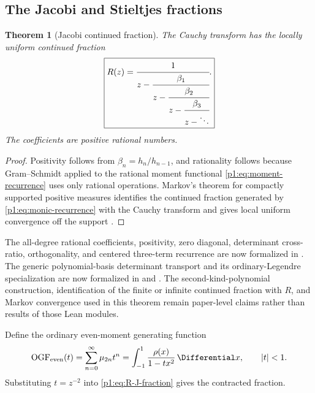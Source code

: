 \documentclass[11pt]{article}
\newtheorem{theorem}{Theorem}[section]
\theoremstyle{definition}
\theoremstyle{remark}
\newcommand{\EvenMomentOrdinaryGeneratingFunction}{\operatorname{OGF}_{\mathrm{even}}}
\begin{document}
\subsection{The Jacobi and Stieltjes fractions}

\begin{theorem}[Jacobi continued fraction]\label{p1:thm:J-fraction}
The Cauchy transform has the locally uniform continued fraction
\begin{equation}
 \boxed{
 R(z)=\cfrac{1}{z-\cfrac{\beta_1}{z-\cfrac{\beta_2}{z-
           \cfrac{\beta_3}{z-\ddots}}}}.
 }                                                           \label{p1:eq:R-J-fraction}
\end{equation}
The coefficients are positive rational numbers.
\end{theorem}

\begin{proof}
Positivity follows from \(\beta_n=h_n/h_{n-1}\), and rationality follows because
Gram--Schmidt applied to the rational moment functional \eqref{p1:eq:moment-recurrence}
uses only rational operations.  Markov's theorem for compactly supported positive measures
identifies the continued fraction generated by \eqref{p1:eq:monic-recurrence} with the Cauchy
transform and gives local uniform convergence off the support \cite{p1:VanAssche1993,p1:SimonOPRL}.
\end{proof}

The all-degree rational coefficients, positivity, zero diagonal, determinant
cross-ratio, orthogonality, and centered three-term recurrence are now formalized in
.  The generic polynomial-basis determinant transport and
its ordinary-Legendre specialization are now formalized in
 and
.  The second-kind-polynomial construction,
identification of the finite or infinite continued fraction with \(R\), and Markov
convergence used in this theorem remain paper-level claims rather than results of those
Lean modules.

Define the ordinary even-moment generating function
\begin{equation}
 \EvenMomentOrdinaryGeneratingFunction(t)=\sum_{n=0}^{\infty}\mu_{2n}t^n
 =\int_{-1}^{1}\frac{\rho(x)}{1-tx^2}\,\Differential x,
 \qquad |t|<1.                                               \label{p1:eq:O-def}
\end{equation}
Substituting \(t=z^{-2}\) into \eqref{p1:eq:R-J-fraction} gives the contracted fraction.
\end{document}
